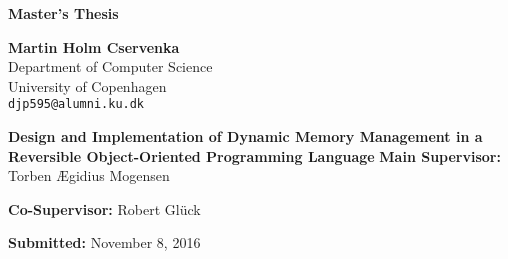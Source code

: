 \begin{titlepage}

\begin{flushleft}
\vspace*{3cm}
\textbf{\huge{Master's Thesis}}

\vspace*{3mm}
\textbf{Martin Holm Cservenka} \\
Department of Computer Science \\
University of Copenhagen \\
\texttt{djp595@alumni.ku.dk} 


\vspace*{4cm}
\textbf{\huge{Design and Implementation of Dynamic Memory Management in a Reversible Object-Oriented Programming Language}}
\vfill
\textbf{Main Supervisor:} Torben Ægidius Mogensen

\textbf{Co-Supervisor:} Robert Glück

\textbf{Submitted:} November 8, 2016
\end{flushleft}
\end{titlepage}